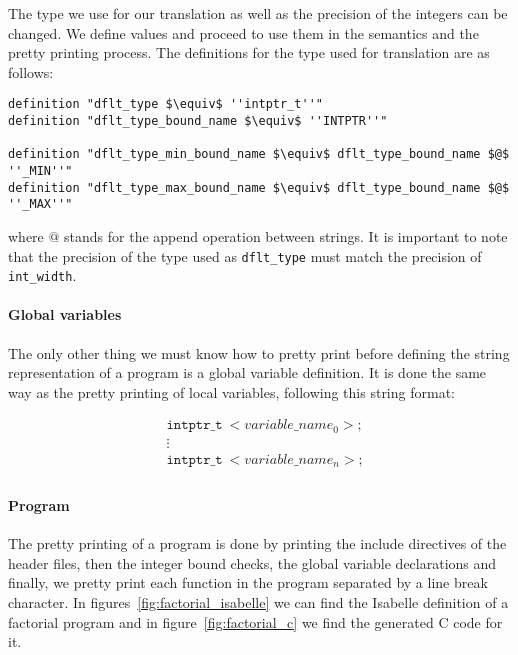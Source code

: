 The type we use for our translation as well as the precision of the integers can be changed.
We define values and proceed to use them in the semantics and the pretty printing process.
The definitions for the type used for translation are as follows:

\begin{lstlisting}[frame=single, mathescape=true]
definition "dflt_type $\equiv$ ''intptr_t''"
definition "dflt_type_bound_name $\equiv$ ''INTPTR''"

definition "dflt_type_min_bound_name $\equiv$ dflt_type_bound_name $@$ ''_MIN''"
definition "dflt_type_max_bound_name $\equiv$ dflt_type_bound_name $@$ ''_MAX''"
\end{lstlisting}

where $@$ stands for the append operation between strings.
It is important to note that the precision of the type used as \verb|dflt_type| must match the precision of \verb|int_width|.

\paragraph{Global variables}

The only other thing we must know how to pretty print before defining the string representation of a program is a global variable definition.
It is done the same way as the pretty printing of local variables, following this string format:

\begin{equation*}
\begin{split}
& \mathtt{intptr\_t}\ <variable\_name_0>; \\
& \vdots \\
& \mathtt{intptr\_t}\ <variable\_name_n>; \\
\end{split}
\end{equation*}

\paragraph{Program}

The pretty printing of a program is done by printing the include directives of the header files, then the integer bound checks, the global variable declarations and finally, we pretty print each function in the program separated by a line break character.
In figures~\ref{fig:factorial_isabelle} we can find the Isabelle definition of a factorial program and in figure~\ref{fig:factorial_c} we find the generated C code for it.

